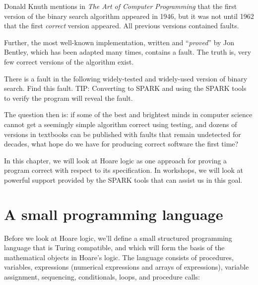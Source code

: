Donald Knuth mentions in {\em The Art of Computer Programming} \cite{knuth73} that the first version of the binary search algorithm appeared in 1946, but it was not until 1962 that the first {\em correct} version appeared. All previous versions contained faults.

Further, the most well-known implementation, written and ``\emph{proved}'' by Jon Bentley, which has been adapted many times, contains a fault. The truth is, very few correct versions of the algorithm exist.



\begin{exercise}
There is a fault in the following widely-tested and widely-used version of binary search. Find this fault. TIP: Converting to SPARK and using the SPARK tools to verify the program will reveal the fault.

\lstset{aboveskip=3mm}

\end{exercise}

The question then is: if some of the best and brightest minds in computer science cannot get a seemingly simple algorithm correct using testing, and dozens of versions in textbooks can be published with faults that remain undetected for decades, what hope do we have for producing correct software the first time?

In this chapter, we will look at Hoare logic as one approach for proving a program correct with respect to its specification. In workshops, we will look at powerful support provided by the SPARK tools that can assist us in this goal.

\section{A small programming language}

Before we look at Hoare logic, we'll define a small structured programming language that is Turing compatible, and which will form the basis of the mathematical objects in Hoare's logic. The language consists of procedures, variables, expressions (numerical expressions and arrays of expressions), variable assignment, sequencing, conditionals, loops, and procedure calls:


